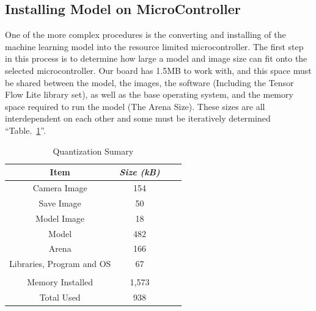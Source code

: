 \documentclass[conference]{IEEEtran}
\begin{document}
\subsection{Installing Model on MicroController}
One of the more complex procedures is the converting and installing of the machine learning model into the resource limited microcontroller. The first step in this process is to determine how large a model and image size can fit onto the selected microcontroller. Our board has 1.5MB to work with, and this space must be shared between the model, the images, the software (Including the Tensor Flow Lite library set), as well as the base operating system, and the memory space required to run the model (The Arena Size).  These sizes are all interdependent on each other and some must be iteratively determined ``Table.~\ref{memUse}''.
\begin{table}[htbp]
\caption{Quantization Sumary}
\begin{center}
\begin{tabular}{|c|c|c|c|}
\hline
\textbf{Item} & \textbf{\textit{Size (kB)}}    \\ \hline 
	Camera Image & 154\\ \hline
	Save Image & 50\\ \hline
	Model Image &  18 \\ \hline 
	Model& 482 \\ \hline 
	Arena& 166 \\ \hline 
	Libraries, Program and OS & 67\\ \hline 
	 & \\ \hline
	 Memory Installed & 1,573 \\ \hline
	 Total Used& 938 \\ \hline
\end{tabular}
\label{memUse}
\end{center}
\end{table}
\end{document}
